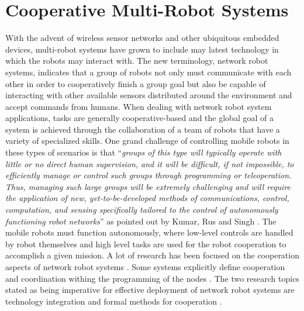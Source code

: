 
\chapter{Cooperative Multi-Robot Systems}

  With the advent of wireless sensor networks and other ubiquitous embedded 
    devices, multi-robot systems have grown to include may latest technology in 
    which the robots may interact with.
  The new terminology, network robot systems, indicates that a group of robots 
    not only must communicate with each other in order to cooperatively finish a 
    group goal but also be capable of interacting with other available sensors
    distributed around the environment and accept commands from humans.
  When dealing with network robot system applications, tasks are generally 
    cooperative-based and the global goal of a system is achieved through the 
    collaboration of a team of robots that have a variety of specialized skills. 
  One grand challenge of controlling mobile robots in these types of scenarios 
    is that ``\textit{groups of this type will typically operate with little or 
    no direct human supervision, and it will be difficult, if not impossible, to
    efficiently manage or control such groups through programming or 
    teleoperation. 
  Thus, managing such large groups will be extremely challenging and will 
    require the application of new, yet-to-be-developed methods of communications, 
    control, computation, and sensing specifically tailored to the control of 
    autonomously functioning robot networks}'' as pointed out by Kumar, Rus and 
    Singh \cite{Kumar2004}.
  The mobile robots must function autonomously, where low-level controls are 
    handled by robot themselves and high level tasks are used for the robot 
    cooperation to accomplish a given mission. 
  A lot of research has been focused on the cooperation aspects of network robot 
    systems 
    \cite{Parker2009,Li2008,Cao1997,Min1998,Fong2003,Kube1992,
          Pirjanian2000,Pirjanian2000b,Beni1989,Mataric1992}.
  Some systems explicitly define cooperation and coordination withing the
    programming of the nodes \cite{Levner2006,Asama1989}.
  The two research topics stated as being imperative for effective deployment of
    network robot systems are technology integration and formal methods for 
    cooperation \cite{Saffiotti2008}.

